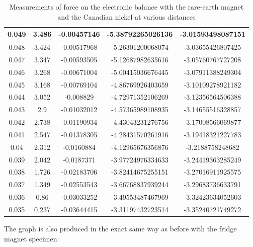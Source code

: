 \documentclass[letterpaper]{article}
\begin{document}
\begin{table}[H]
{\begin{tabular}{|c|c|c|c|c|}
   0.049          & 3.486               & -0.00457146            & -5.38792265026136 & -3.01593498087151 \\ \hline
   0.048          & 3.424               & -0.00517968            & -5.26301200068074 & -3.03655426807425 \\ \hline
   0.047          & 3.347               & -0.00593505            & -5.12687982635616 & -3.05760767727208 \\ \hline
   0.046          & 3.268               & -0.00671004            & -5.00415036676445 & -3.07911388249304 \\ \hline
   0.045          & 3.168               & -0.00769104            & -4.86769926403659 & -3.10109278921182 \\ \hline
   0.044          & 3.052               & -0.008829              & -4.72971352106269 & -3.12356564506388 \\ \hline
   0.043          & 2.9                 & -0.01032012            & -4.57365989108935 & -3.14655516328857 \\ \hline
   0.042          & 2.738               & -0.01190934            & -4.43043231276756 & -3.17008566069877 \\ \hline
   0.041          & 2.547               & -0.01378305            & -4.28431570261916 & -3.19418321227783 \\ \hline
   0.04           & 2.312               & -0.0160884             & -4.12965676356876 & -3.2188758248682  \\ \hline
   0.039          & 2.042               & -0.0187371             & -3.97724976334633 & -3.24419363285249 \\ \hline
   0.038          & 1.726               & -0.02183706            & -3.82414675255151 & -3.27016911925575 \\ \hline
   0.037          & 1.349               & -0.02553543            & -3.66768837939244 & -3.29683736633791 \\ \hline
   0.036          & 0.86                & -0.03033252            & -3.49553487467969 & -3.32423634052603 \\ \hline
   0.035          & 0.237               & -0.03644415            & -3.31197432723514 & -3.35240721749272 \\ \hline
  \end{tabular}
 }
 \caption{Measurements of force on the electronic balance with the rare-earth magnet and the Canadian nickel at various distances}
\end{table}
The graph is also produced in the exact same way as before with the fridge magnet specimen:
\end{document}
